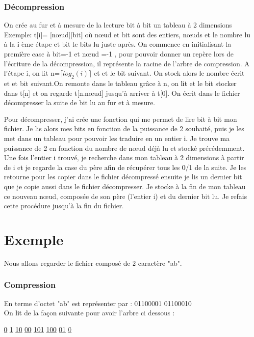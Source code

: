 \documentclass{report}
\begin{document}
\subsubsection{Décompression}
On crée au fur et à mesure de la lecture bit à bit un tableau à 2 dimensions Exemple: t[i]= [nœud][bit] où nœud et bit sont des entiers, nœuds et le nombre lu à la i ème étape et bit le bits lu juste après. 
On commence en initialisant la première case à  bit=-1 et nœud =-1 , pour pouvoir donner un repère lors de l'écriture de la décompression, il représente la racine de l'arbre de compression.  
A l'étape i, on lit n=$\lceil log_{2}(i) \rceil$ et et le bit suivant. On stock alors le nombre écrit et et bit suivant.On remonte dans le tableau grâce à n, on lit et le bit stocker dans t[n] et on regarde t[n.nœud] jusqu'à arriver à t[0]. On écrit dans le fichier décompresser la suite de bit lu au fur et à mesure.

Pour décompresser, j'ai crée une fonction qui me permet de lire bit à bit mon fichier. Je lis alors mes bits en fonction de la puissance de 2 souhaité, puis je les met dans un tableau pour pouvoir les traduire en un entier i. 
Je trouve ma puissance de 2 en fonction du nombre de nœud déjà lu et stocké précédemment.
Une fois l'entier i  trouvé, je recherche dans mon tableau à 2 dimensions à partir de i et je regarde la case du père afin de récupérer tous les 0/1 de la suite. Je les retourne pour les copier dans le fichier décompressé ensuite je lis un dernier bit que je copie aussi dans le fichier décompresser.
Je stocke à la fin de mon tableau ce nouveau nœud, composée de son père (l'entier i) et du dernier bit lu. 
Je refais cette procédure jusqu'à la fin du fichier. 

 
\section*{Exemple}
Nous allons regarder le fichier composé de 2 caractère "ab".

\subsubsection{Compression}
En terme d'octet "ab" est représenter par : 
		01100001 01100010\\
On lit de la façon suivante pour avoir l'arbre ci dessous :\begin{center}

\underline{0} \underline{1} \underline{10} \underline{00} \underline{101}  \underline{100} \underline{01} \underline{0}
\\
\end{center}
\end{document}
